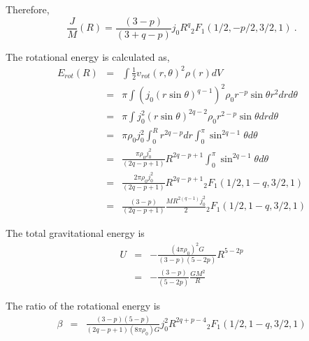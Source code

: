Therefore, 
\begin{equation}
\frac{J}{M}(R) = \frac{(3-p)}{(3+q-p)} j_0 R^{q} {}_2F_1(1/2, -p/2, 3/2, 1) ~.
\end{equation}

The rotational energy is calculated as,
\begin{eqnarray}
E_{rot}(R) &=& \int \frac{1}{2} v_{rot} (r,\theta)^2 \rho(r) dV \\
&=& \pi \int \left(j_0 (r \sin \theta)^{q-1}\right)^2 \rho_0 r^{-p} \sin\theta r^2 dr d\theta \nonumber\\
&=& \pi  \int j_0^2 (r \sin \theta)^{2q-2} \rho_0 r^{2-p} \sin\theta dr d\theta  \nonumber\\
&=& \pi \rho_0  j_0^2  \int_0^R  r ^{2q-p}  dr  \int_0^\pi  \sin^{2q-1} \theta  d\theta  \nonumber\\
&=& 
\frac{\pi \rho_0  j_0^2 }{(2q-p+1)} R^{2q-p+1}
\int_0^\pi  \sin^{2q-1} \theta  d\theta   \nonumber\\
&=& \frac{2\pi \rho_0  j_0^2 }{(2q-p+1)} R^{2q-p+1} {}_2F_1(1/2, 1-q, 3/2, 1) \\
&=& \frac{(3-p)}{(2q-p+1)} \frac{M R^{2(q-1)}  j_0^2 }{2} {}_2F_1(1/2, 1-q, 3/2, 1)
\end{eqnarray}

The total gravitational energy is 
\begin{eqnarray}
U &=& -\frac{(4\pi\rho_0)^2 G}{(3-p)(5-2p)} R^{5-2p}\\
&=& -\frac{(3-p)}{(5-2p)}\frac{G M^2}{R}
\end{eqnarray}

The ratio of the rotational energy is
\begin{eqnarray}
\beta &=& \frac{(3-p)(5-p)}{(2q-p+1)(8\pi \rho_0)G} j_0^2 R^{2q+p-4} {}_2F_1(1/2, 1-q, 3/2, 1)
\end{eqnarray}